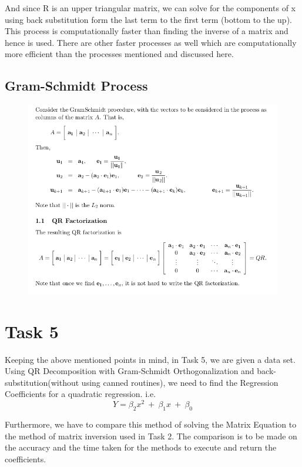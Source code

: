 \documentclass[11pt]{article}
\begin{document}
And since R is an upper triangular matrix, we can solve for the components of x using back substitution form the last term to the first term (bottom to the up). This process is computationally faster than finding the inverse of a matrix and hence is used. There are other faster processes as well which are computationally more efficient than the processes mentioned and discussed here.
\newpage
\subsection{Gram-Schmidt Process}
\begin{figure}[h!]
	\centering
	\centering
	\includegraphics[width=\linewidth]{GS_Process}
	\label{GS_orthogonalization}
\end{figure}

\section{Task 5}
Keeping the above mentioned points in mind, in Task 5, we are given a data set. Using QR Decomposition with Gram-Schmidt Orthogonalization and back-substitution(without using canned routines), we need to find the Regression Coefficients for a quadratic regression. i.e. 
\[ Y = \beta_2 x^2 ~+~ \beta_1 x ~+~ \beta_0\]

Furthermore, we have to compare this method of solving the Matrix Equation to the method of matrix inversion used in Task 2. The comparison is to be made on the  accuracy and the time taken for the methods to execute and return the coefficients.\\
\end{document}
